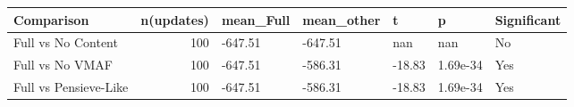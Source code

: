 \begin{tabular}{lrlllll}
\toprule
Comparison & n(updates) & mean_Full & mean_{other} & t & p & Significant \\
\midrule
Full vs No Content & 100 & -647.51 & -647.51 & nan & nan & No \\
Full vs No VMAF & 100 & -647.51 & -586.31 & -18.83 & 1.69e-34 & Yes \\
Full vs Pensieve-Like & 100 & -647.51 & -586.31 & -18.83 & 1.69e-34 & Yes \\
\bottomrule
\end{tabular}
